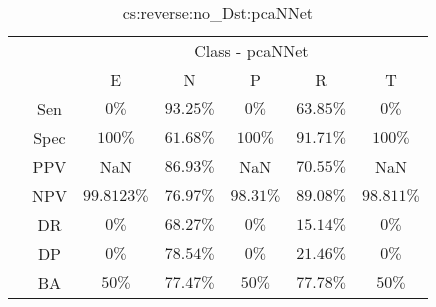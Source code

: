 \begin{table}[!ht]
	\centering
	\begin{tabular}{|c|c|c|c|c|c|c|}
		\cline{3-7}
		\multicolumn{2}{c|}{} & \multicolumn{5}{c|}{Class - pcaNNet} \\ \cline{3-7}
		\multicolumn{2}{c|}{} & E & N & P & R & T \\ \hline
		\multirow{7}{*}{\rotatebox{90}{Statistics}} & Sen & $0\%$ & $93.25\%$ & $0\%$ & $63.85\%$ & $0\%$ \\ \cline{2-7}
		 & Spec & $100\%$ & $61.68\%$ & $100\%$ & $91.71\%$ & $100\%$ \\ \cline{2-7}
		 & PPV & NaN & $86.93\%$ & NaN & $70.55\%$ & NaN \\ \cline{2-7}
		 & NPV & $99.8123\%$ & $76.97\%$ & $98.31\%$ & $89.08\%$ & $98.811\%$ \\ \cline{2-7}
		 & DR & $0\%$ & $68.27\%$ & $0\%$ & $15.14\%$ & $0\%$ \\ \cline{2-7}
		 & DP & $0\%$ & $78.54\%$ & $0\%$ & $21.46\%$ & $0\%$ \\ \cline{2-7}
		 & BA & $50\%$ & $77.47\%$ & $50\%$ & $77.78\%$ & $50\%$ \\ \hline
	\end{tabular}
	\caption{cs:reverse:no_Dst:pcaNNet}
	\label{tab:cs:reverse:no_Dst:pcaNNet}
\end{table}
